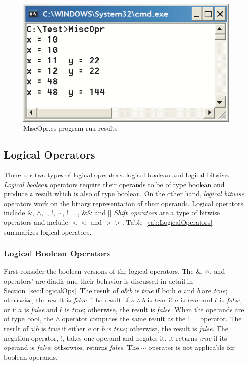 \begin{figure}
\centering
\includegraphics[scale=0.55]{./CSharpBasics/Illus/MiscOprOut}
\caption{MiscOpr.cs program run results} \label{fig:MiscOprOut}
\end{figure}



\subsection{Logical Operators}


There are two types of logical operators: logical boolean and
logical bitwise. \emph{Logical boolean} operators require their
operands to be of type boolean and produce a result which is also
of type boolean. On the other hand, \emph{logical bitwise}
operators work on the binary representation of their operands.
Logical operators include \&, $\wedge$, $\vert$, $!$, $\sim$,
$!\!=$, \&\& and $\vert\vert$ \emph{Shift operators} are a type of
bitwise operators and include $<\!<$ and $>\!>$.
Table~\ref{tab:LogicalOperators} summarizes logical operators.


\subsubsection{Logical Boolean Operators}


First consider the boolean versions of the logical operators. The
\&, $\wedge$, and $\vert$ operators' are diadic and their behavior
is discussed in detail in Section~\ref{sec:LogicalOps}. The result
of $a \& b$ is \emph{true} if both $a$ and $b$ are \emph{true};
otherwise, the result is \emph{false}. The result of $a \wedge b$
is \emph{true} if $a$ is \emph{true} and $b$ is \emph{false}, or
if $a$ is \emph{false} and $b$ is \emph{true}; otherwise, the
result is \emph{false}. When the operands are of type bool, the
$\wedge$ operator computes the same result as the $!\!=$ operator.
The result of $a \vert b$ is \emph{true} if either $a$ or $b$ is
\emph{true}; otherwise, the result is \emph{false}. The negation
operator, $!$, takes one operand and negates it. It returns
\emph{true} if its operand is \emph{false}; otherwise, returns
\emph{false}. The $\sim$ operator is not applicable for boolean
operands.



